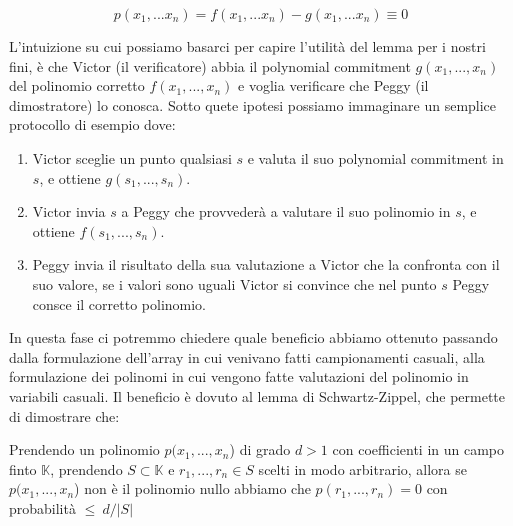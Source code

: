 \begin{equation}
p(x_1,...x_n) = f(x_1,...x_n)-g(x_1,...x_n) \equiv 0
\end{equation}

L'intuizione su cui possiamo basarci per capire l’utilità del lemma per i nostri fini, è che Victor (il verificatore) abbia il polynomial
commitment  $g(x_1,...,x_n)$ del polinomio corretto $f(x_1,...,x_n)$ e voglia verificare che Peggy (il dimostratore) lo
conosca. \clearpage
Sotto quete ipotesi possiamo immaginare un semplice protocollo di esempio dove:
\begin{enumerate}
    \item  Victor sceglie un punto qualsiasi $s$ e valuta il suo polynomial commitment in $s$, e ottiene $g(s_1,...,s_n)$.
    \item  Victor invia $s$ a Peggy che provvederà a valutare il suo polinomio in $s$, e ottiene $f(s_1,...,s_n)$.
    \item  Peggy invia il risultato della sua valutazione a Victor che la confronta con il suo valore, se i
    valori sono uguali Victor si convince che nel punto $s$ Peggy consce il corretto polinomio.
\end{enumerate}

In questa fase ci potremmo chiedere quale beneficio abbiamo ottenuto passando dalla formulazione dell'array in cui
venivano fatti campionamenti casuali, alla formulazione dei polinomi in cui vengono fatte valutazioni del polinomio in
variabili casuali. Il beneficio è dovuto al lemma di Schwartz-Zippel, che permette di dimostrare che:

Prendendo un polinomio $p(x_1,...,x_n$) di grado $d > 1$ con coefficienti in un campo finto $\mathbb{K}$, prendendo 
$S \subset \mathbb{K}$ e $r_1,...,r_n \in S$ scelti in modo arbitrario, allora se $p(x_1,...,x_n$) non è il polinomio nullo
abbiamo che $p(r_1,...,r_n) = 0$ con probabilità $\le \ d/|S|$

